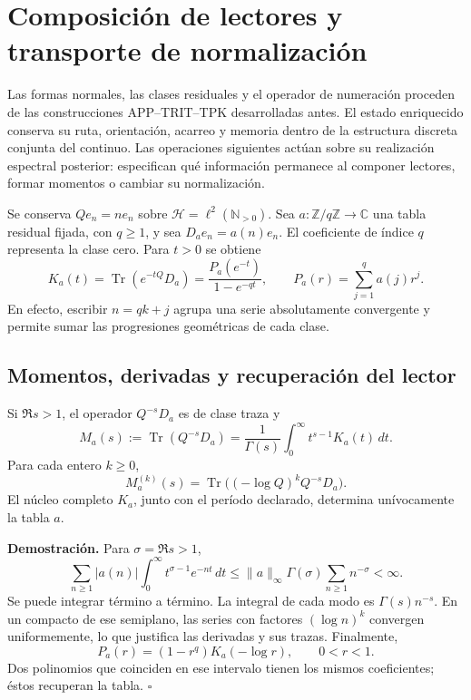 \section{Composición de lectores y transporte de normalización}
\label{ix-add:composicion-lectores}

Las formas normales, las clases residuales y el operador de numeración
proceden de las construcciones APP--TRIT--TPK desarrolladas antes. El estado
enriquecido conserva su ruta, orientación, acarreo y memoria dentro de la
estructura discreta conjunta del continuo. Las operaciones siguientes actúan
sobre su realización espectral posterior: especifican qué información
permanece al componer lectores, formar momentos o cambiar su normalización.

Se conserva $Qe_n=ne_n$ sobre $\mathcal H=\ell^2(\mathbb N_{>0})$.
Sea $a:\mathbb Z/q\mathbb Z\to\mathbb C$ una tabla residual fijada,
con $q\geq1$, y sea $D_ae_n=a(n)e_n$. El coeficiente de índice $q$
representa la clase cero. Para $t>0$ se obtiene
\[
 K_a(t)=\operatorname{Tr}(e^{-tQ}D_a)
 =\frac{P_a(e^{-t})}{1-e^{-qt}},\qquad
 P_a(r)=\sum_{j=1}^{q}a(j)r^j.
\]
En efecto, escribir $n=qk+j$ agrupa una serie absolutamente convergente
y permite sumar las progresiones geométricas de cada clase.

\subsection{Momentos, derivadas y recuperación del lector}
Si $\Re s>1$, el operador $Q^{-s}D_a$ es de clase traza y
\[
 M_a(s):=\operatorname{Tr}(Q^{-s}D_a)
 =\frac1{\Gamma(s)}\int_0^\infty t^{s-1}K_a(t)\,dt.
\]
Para cada entero $k\geq0$,
\[
 M_a^{(k)}(s)=\operatorname{Tr}\bigl((-\log Q)^kQ^{-s}D_a\bigr).
\]
El núcleo completo $K_a$, junto con el período declarado, determina
unívocamente la tabla $a$.

\textbf{Demostración.} Para $\sigma=\Re s>1$,
\[
 \sum_{n\geq1}|a(n)|\int_0^\infty
 t^{\sigma-1}e^{-nt}\,dt
 \leq\|a\|_\infty\Gamma(\sigma)\sum_{n\geq1}n^{-\sigma}<\infty.
\]
Se puede integrar término a término. La integral de cada modo es
$\Gamma(s)n^{-s}$. En un compacto de ese semiplano, las series con
factores $(\log n)^k$ convergen uniformemente, lo que justifica las
derivadas y sus trazas. Finalmente,
\[
 P_a(r)=(1-r^q)K_a(-\log r),\qquad 0<r<1.
\]
Dos polinomios que coinciden en ese intervalo tienen los mismos
coeficientes; éstos recuperan la tabla. \hfill$\square$

